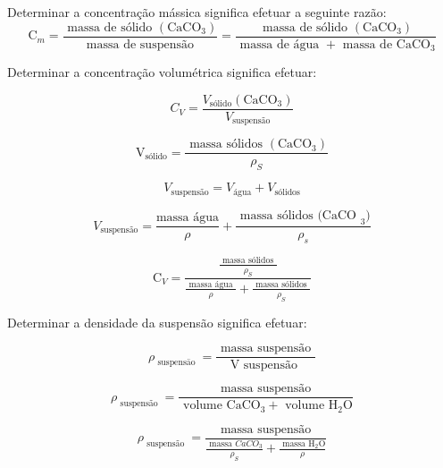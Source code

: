 Determinar a concentração mássica significa efetuar a seguinte razão:
\begin{equation}\label{key}
\mathrm{C}_{m}=\frac{\text { massa de sólido }\left(\mathrm{CaCO}_{3}\right)}{\text { massa de suspensão }}=\frac{\text { massa de sólido }\left(\mathrm{CaCO}_{3}\right)}{\text { massa de água }+\text { massa de } \mathrm{CaCO}_{3}}
\end{equation}


Determinar a concentração volumétrica significa efetuar:

\begin{equation}\label{key}
C_{V}=\frac{ V_{\text{sólido}} \left(\mathrm{CaCO}_{3}\right)}{V_{\text{suspensão}}}
\end{equation}


\begin{equation}\label{key}
\mathrm{V}_{ \text {sólido}}=\frac{\text { massa sólidos }\left(\mathrm{CaCO}_{3}\right)}{\rho_{S}}
\end{equation}


\begin{equation}\label{key}
V_{\text{suspensão}} = V_{\text{água}}+V_{\text{sólidos}}
\end{equation}


\begin{equation}\label{key}
V_{\text{suspensão}} = \dfrac{ \text{massa água} }{\rho}+\dfrac{\text { massa sólidos (CaCO }_{3} )}{\rho_{s}}
\end{equation}


\begin{equation}\label{key}
\mathrm{C}_{V}=\frac{\frac{\text { massa sólidos }}{\rho_{S}}}{\frac{\text { massa água }}{\rho}+\frac{\text { massa sólidos }}{\rho_{S}}}
\end{equation}

Determinar a densidade da suspensão significa efetuar:

\begin{equation}\label{key}
\rho_{\text { suspensäo }}=\frac{\text { massa suspensão }}{\mathrm{V} \text { suspensão }}
\end{equation}

\begin{equation}\label{key}
\rho_{\text { suspensão }}=\frac{\text { massa suspensão }}{\text { volume } \mathrm{CaCO}_{3}+\text { volume } \mathrm{H_{2} O}}
\end{equation}


\begin{equation}\label{key}
\rho_{\text { suspensão }}=\frac{\text { massa suspensão }}{\frac{\text { massa }CaCO_{3}}{\rho_{S}}+\frac{\text { massa } \mathrm{H_{2} O}}{\rho}}
\end{equation}

